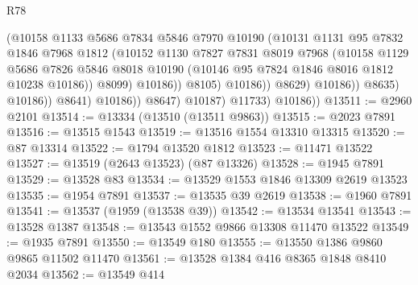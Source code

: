 \begin{lexlean}{R78}
\begin{coremodule}
                                      (@10158
                                        @1133
                                        @5686
                                        @7834
                                        @5846
                                        @7970
                                        @10190
                                        (@10131
                                          @1131
                                          @95
                                          @7832
                                          @1846
                                          @7968
                                          @1812
                                          (@10152
                                            @1130
                                            @7827
                                            @7831
                                            @8019
                                            @7968
                                            (@10158
                                              @1129
                                              @5686
                                              @7826
                                              @5846
                                              @8018
                                              @10190
                                              (@10146 @95 @7824 @1846 @8016 @1812 @10238 @10186))
                                            @8099)
                                          @10186))
                                      @8105)
                                    @10186))
                                @8629)
                              @10186))
                          @8635)
                        @10186))
                    @8641)
                  @10186))
              @8647)
            @10187)
          @11733)
        @10186))
@13511 := @2960 @2101
@13514 := @13334 (@13510 (@13511 @9863))
@13515 := @2023 @7891
@13516 := @13515 @1543
@13519 := @13516 @1554 @13310 @13315
@13520 := @87 @13314
@13522 := @1794 @13520 @1812
@13523 := @11471 @13522
@13527 := @13519 (@2643 @13523) (@87 @13326)
@13528 := @1945 @7891
@13529 := @13528 @83
@13534 := @13529 @1553 @1846 @13309 @2619 @13523
@13535 := @1954 @7891
@13537 := @13535 @39 @2619
@13538 := @1960 @7891
@13541 := @13537 (@1959 (@13538 @39))
@13542 := @13534 @13541
@13543 := @13528 @1387
@13548 := @13543 @1552 @9866 @13308 @11470 @13522
@13549 := @1935 @7891
@13550 := @13549 @180
@13555 := @13550 @1386 @9860 @9865 @11502 @11470
@13561 := @13528 @1384 @416 @8365 @1848 @8410 @2034
@13562 := @13549 @414

\end{coremodule}
\end{lexlean}
